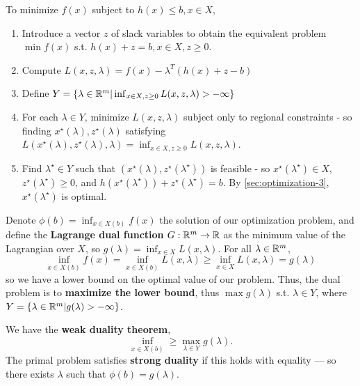 \begin{thm}
  \label{sec:optimization-4}
  To minimize $f(x)$ subject to $h(x) \leq b, x \in X$,
  \begin{enumerate}
  \item Introduce a vector $z$ of slack variables to obtain the
    equivalent problem $\min f(x)$ s.t. $h(x) + z = b, x \in X, z \geq
    0$.
  \item Compute $L(x, z, \lambda) = f(x) - \lambda^{T}(h(x) + z - b)$
  \item Define $Y = \{ \lambda \in \mathbb{R}^{m} | \inf_{x \in X, z \geq 0}
    L(x, z, \lambda) > -\infty \} $
  \item For each $\lambda \in Y$, minimize $L(x, z, \lambda)$ subject
    only to regional constraints - so finding $x^{\star}(\lambda),
    z^{\star}(\lambda)$ satisfying $L(x^{\star}(\lambda),
    z^{\star}(\lambda), \lambda) = \inf_{x \in X, z \geq 0} L(x, z,
    \lambda)$.
  \item Find $\lambda^{\star} \in Y$ such that $(x^{\star}(\lambda),
    z^{\star}(\lambda^{\star}))$ is feasible - so
    $x^{\star}(\lambda^{\star}) \in X$, $z^{\star}(\lambda^{\star})
    \geq 0$, and $h(x^{\star}(\lambda^{\star})) +
    z^{\star}(\lambda^{\star}) = b$.  By \ref{sec:optimization-3},
    $x^{\star}(\lambda^{\star})$ is optimal.
  \end{enumerate}
\end{thm}

\begin{defn}
  \label{sec:optimization-5}
  Denote $\phi(b) = \inf_{x \in X(b)}f(x)$ the solution of our
  optimization problem, and define the \textbf{Lagrange dual function}
  $G: \mathbb{R}^{m} \rightarrow \mathbb{R}$ as the minimum value of the Lagrangian
  over $X$, so $g(\lambda) = \inf_{x \in X} L(x, \lambda)$. For all
  $\lambda \in \mathbb{R}^{m}$,
  \begin{equation}
    \label{eq:2}
    \inf_{x \in X(b)} f(x) = \inf_{x \in X(b)} L(x, \lambda) \geq
    \inf_{x \in X} L(x, \lambda) = g(\lambda)
  \end{equation}
  so we have a lower bound on the optimal value of our problem.  Thus,
  the dual problem is to \textbf{maximize the lower bound}, thus $\max
  g(\lambda)$ s.t. $\lambda \in Y$, where $Y = \{ \lambda \in \mathbb{R}^{m} |
g(\lambda) > -\infty \} $.
\end{defn}

\begin{thm}
  \label{sec:optimization-6}
  We have the \textbf{weak duality theorem},
  \begin{equation}
    \inf_{x \in X(b)} \geq \max_{\lambda \in Y} g(\lambda).\label{eq:16}
  \end{equation}
  The primal problem satisfies \textbf{strong duality} if this holds
  with equality --- so there exists $\lambda$ such that $\phi(b) =
  g(\lambda)$.
\end{thm}

